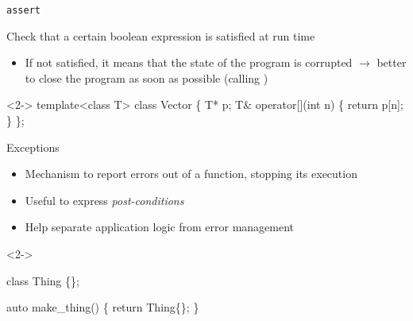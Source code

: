 \begin{frame}[fragile]{\texttt{assert}}

  Check that a certain boolean expression is satisfied at run time
  \begin{itemize}
  \item If not satisfied, it means that the state of the program is corrupted
    $\rightarrow$ better to close the program as soon as possible (calling
    )
  \end{itemize}

  \begin{codeblock}<2->{
template<class T> class Vector \{
  T* p;
  \ddd
  T\& operator[](int n) \{
    return p[n];
  \}
\};}\end{codeblock}

\end{frame}

\begin{frame}[fragile]{Exceptions}

  \begin{itemize}
  \item Mechanism to report errors out of a function, stopping its execution
  \item Useful to express \textit{post-conditions}
  \item Help separate application logic from error management
  \end{itemize}

  \begin{codeblock}<2->{
class Thing \{\ddd\};

auto make\_thing() \{
  return Thing\{\}; 
\}}\end{codeblock}

\end{frame}

